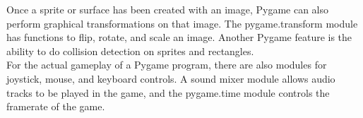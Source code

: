 Once a sprite or surface has been created with an image, Pygame can also perform graphical transformations on that image. The pygame.transform module has functions to flip, rotate, and scale an image. Another Pygame feature is the ability to do collision detection on sprites and rectangles.\\

For the actual gameplay of a Pygame program, there are also modules for joystick, mouse, and keyboard controls. A sound mixer module allows audio tracks to be played in the game, and the pygame.time module controls the framerate of the game.